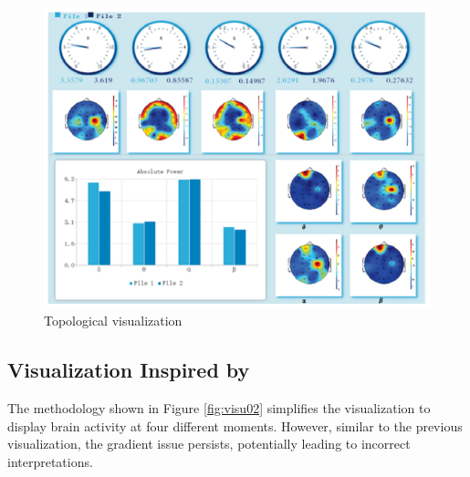 \documentclass[format=sigconf]{acmart}
\begin{document}
			\begin{figure}[h]
				\centering
				\includegraphics[width=\linewidth]{../presentation/images/visu01}
				\caption{Topological visualization}
				\label{fig:visu01}
			\end{figure}
	
		\subsection{Visualization Inspired by \cite{8937083}}
			\par The methodology shown in Figure \ref{fig:visu02} simplifies the visualization to display brain activity at four different moments. However, similar to the previous visualization, the gradient issue persists, potentially leading to incorrect interpretations.
			
\end{document}
